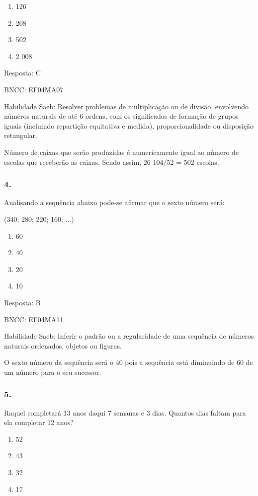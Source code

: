 \begin{enumerate}
\def\labelenumi{\alph{enumi})}
\item
  126
\item
  208
\item
  502
\item
  2 008
\end{enumerate}

Resposta: C

BNCC: EF04MA07

Habilidade Saeb: Resolver problemas de multiplicação ou de divisão,
envolvendo números naturais de até 6 ordens, com os significados de
formação de grupos iguais (incluindo repartição equitativa e medida),
proporcionalidade ou disposição retangular.

Número de caixas que serão produzidas é numericamente igual ao número de
escolas que receberão as caixas. Sendo assim, 26 104/52 = 502 escolas.

\subsubsection{4. }\label{section-160}

Analisando a sequência abaixo pode-se afirmar que o sexto número será:

(340; 280; 220; 160; ...)

\begin{enumerate}
\def\labelenumi{\alph{enumi})}
\item
  60
\item
  40
\item
  20
\item
  10
\end{enumerate}

Resposta: B

BNCC: EF04MA11

Habilidade Saeb: Inferir o padrão ou a regularidade de uma sequência de
números naturais ordenados, objetos ou figuras.

O sexto número da sequência será o 40 pois a sequência está diminuindo
de 60 de um número para o seu sucessor.

\subsubsection{5.}\label{section-161}

Raquel completará 13 anos daqui 7 semanas e 3 dias. Quantos dias faltam
para ela completar 12 anos?

\begin{enumerate}
\def\labelenumi{\alph{enumi})}
\item
  52
\item
  43
\item
  32
\item
  17
\end{enumerate}

